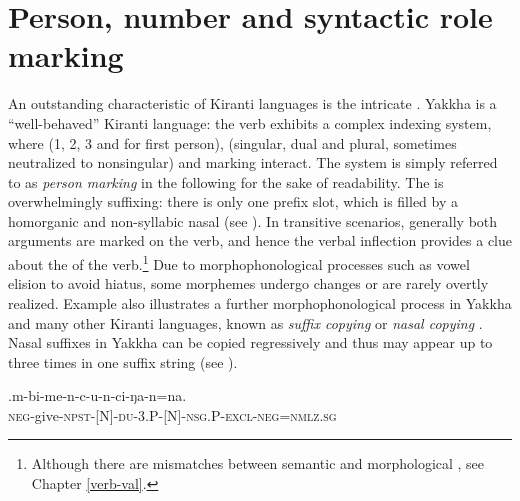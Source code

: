 \section{Person, number and syntactic role marking}\label{verb-infl}

An outstanding characteristic of Kiranti languages is the intricate . Yakkha is a “well-behaved” Kiranti language: the verb exhibits a complex indexing system, where  (1, 2, 3 and  for first person),   (singular, dual and plural, sometimes neutralized to nonsingular) and  marking interact. The system is simply referred to as \emph{person marking} in the following for the sake of readability. The   is overwhelmingly suffixing: there is only one prefix slot, which is filled by a homorganic  and non-syllabic nasal (see \Next). In transitive scenarios, generally both arguments are marked on the verb, and hence the verbal inflection provides a clue about the  of the verb.\footnote{Although there are mismatches between semantic and morphological , see Chapter \ref{verb-val}.} Due to morphophonological processes such as vowel elision to avoid hiatus, some morphemes undergo changes or are rarely overtly realized. Example \Next also illustrates a further morphophonological process in Yakkha and many other Kiranti languages, known as \emph{suffix copying} or \emph{nasal copying} \citep{Bickel2003Belhare, Doornenbal2009A-grammar, Ebert2003Kiranti, Schikowski2012_Morphology}. Nasal suffixes in Yakkha  can be copied regressively and thus may appear up to three times in one suffix string (see ).


\exg.m-bi-me-n-c-u-n-ci-ŋa-n=na.\\
{\scshape neg-}give{\scshape -npst-[N]-du-3.P-[N]-nsg.P-excl-neg=nmlz.sg}\\


